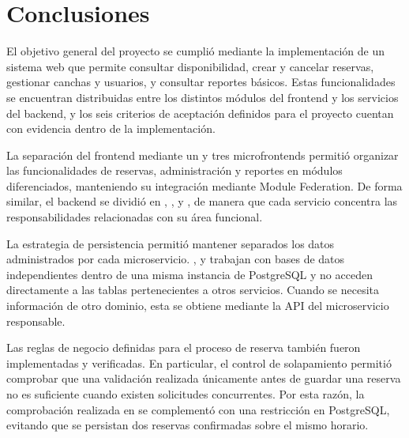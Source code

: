 
\section{Conclusiones}
\label{sec:conclusiones}

El objetivo general del proyecto se cumplió mediante la implementación de un
sistema web que permite consultar disponibilidad, crear y cancelar reservas,
gestionar canchas y usuarios, y consultar reportes básicos. Estas
funcionalidades se encuentran distribuidas entre los distintos módulos del
frontend y los servicios del backend, y los seis criterios de aceptación
definidos para el proyecto cuentan con evidencia dentro de la implementación.

La separación del frontend mediante un  y tres microfrontends permitió
organizar las funcionalidades de reservas, administración y reportes en módulos
diferenciados, manteniendo su integración mediante Module Federation. De forma
similar, el backend se dividió en , ,
 y , de manera que cada servicio concentra las
responsabilidades relacionadas con su área funcional.

La estrategia de persistencia permitió mantener separados los datos
administrados por cada microservicio. ,  y
 trabajan con bases de datos independientes dentro de una misma
instancia de PostgreSQL y no acceden directamente a las tablas pertenecientes
a otros servicios. Cuando se necesita información de otro dominio, esta se
obtiene mediante la API del microservicio responsable.

Las reglas de negocio definidas para el proceso de reserva también fueron
implementadas y verificadas. En particular, el control de solapamiento permitió
comprobar que una validación realizada únicamente antes de guardar una reserva
no es suficiente cuando existen solicitudes concurrentes. Por esta razón, la
comprobación realizada en  se complementó con una restricción
en PostgreSQL, evitando que se persistan dos reservas confirmadas sobre el mismo
horario.

